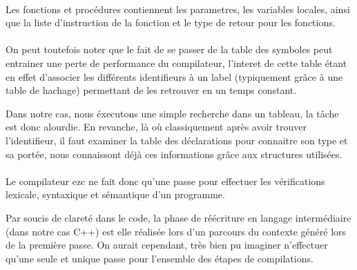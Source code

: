 \paragraph{}Les fonctions et procédures contiennent les parametres, les variables locales, ainsi que 
la liste d'instruction de la fonction et le type de retour pour les fonctions.

\paragraph{}On peut toutefois noter que le fait de se passer de la table des symboles peut entrainer 
une perte de performance du compilateur, l'interet de cette table étant en effet d'associer les 
différents identifieurs à un label (typiquement grâce à une table de hachage) permettant de les 
retrouver en un temps constant.

Dans notre cas, nous éxecutons une simple recherche dans un tableau,
la tâche est donc alourdie. En revanche, là où classiquement après avoir trouver l'identifieur, 
il faut examiner la table des déclarations pour connaitre son type et sa portée, 
nous connaissont déjà ces informations grâce aux structures utilisées.

\paragraph{}Le compilateur ezc ne fait donc qu'une passe pour effectuer les vérifications lexicale, 
syntaxique et sémantique d'un programme.

Par soucis de clareté dans le code, la phase de réécriture en langage intermédiaire (dans notre cas C++)
est elle réalisée lors d'un parcours du contexte généré lors de la première passe. On aurait cependant, très bien
pu imaginer n'effectuer qu'une seule et unique passe pour l'ensemble des étapes de compilations.

